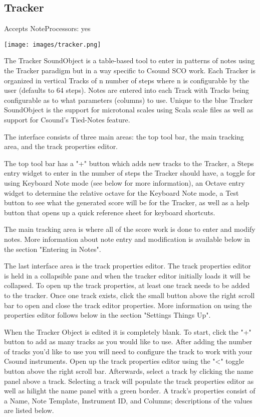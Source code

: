 \subsection{Tracker}\label{tracker}

Accepts NoteProcessors: yes

\texttt{[image: images/tracker.png]}

The Tracker SoundObject is a table-based tool to enter in patterns of
notes using the Tracker paradigm but in a way specific to Csound SCO
work. Each Tracker is organized in vertical Tracks of n number of steps
where n is configurable by the user (defaults to 64 steps). Notes are
entered into each Track with Tracks being configurable as to what
parameters (columns) to use. Unique to the blue Tracker SoundObject is
the support for microtonal scales using Scala scale files as well as
support for Csound's Tied-Notes feature.

The interface consists of three main areas: the top tool bar, the main
tracking area, and the track properties editor.

The top tool bar has a "+" button which adds new tracks to the Tracker,
a Steps entry widget to enter in the number of steps the Tracker should
have, a toggle for using Keyboard Note mode (see below for more
information), an Octave entry widget to determine the relative octave
for the Keyboard Note mode, a Test button to see what the generated
score will be for the Tracker, as well as a help button that opens up a
quick reference sheet for keyboard shortcuts.

The main tracking area is where all of the score work is done to enter
and modify notes. More information about note entry and modification is
available below in the section "Entering in Notes".

The last interface area is the track properties editor. The track
properties editor is held in a collapsible pane and when the tracker
editor initially loads it will be collapsed. To open up the track
properties, at least one track needs to be added to the tracker. Once
one track exists, click the small button above the right scroll bar to
open and close the track editor properties. More information on using
the properties editor follows below in the section "Settings Things Up".

When the Tracker Object is edited it is completely blank. To start,
click the "+" button to add as many tracks as you would like to use.
After adding the number of tracks you'd like to use you will need to
configure the track to work with your Csound instruments. Open up the
track properties editor using the "\textless{}" toggle button above the
right scroll bar. Afterwards, select a track by clicking the name panel
above a track. Selecting a track will populate the track properties
editor as well as hilight the name panel with a green border. A track's
properties consist of a Name, Note Template, Instrument ID, and Columns;
descriptions of the values are listed below.

